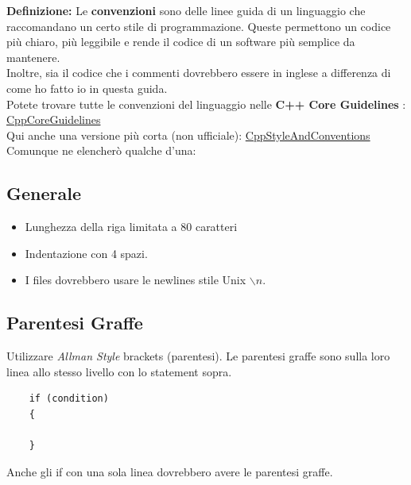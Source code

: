 \textsf{\small \textbf{Definizione: } Le \textbf{convenzioni} sono delle linee guida di un linguaggio che raccomandano un certo stile di programmazione. Queste permettono un codice più chiaro, più leggibile e rende il codice di un software più semplice da mantenere.} \\

\textsf{\small Inoltre, sia il codice che i commenti dovrebbero essere in inglese a differenza di come ho fatto io in questa guida.} \\

\textsf{\small Potete trovare tutte le convenzioni del linguaggio nelle \textbf{C++ Core Guidelines} : \href{https://github.com/isocpp/CppCoreGuidelines}{CppCoreGuidelines}} \\

\textsf{\small Qui anche una versione più corta (non ufficiale): \href{https://github.com/openbmc/docs/blob/master/cpp-style-and-conventions.md}{CppStyleAndConventions}} \\

\textsf{\small Comunque ne elencherò qualche d'una: } \break

\subsection{Generale}

\begin{itemize}
	\item \textsf{\small Lunghezza della riga limitata a 80 caratteri}
	\item \textsf{\small Indentazione con 4 spazi.}
	\item \textsf{\small I files dovrebbero usare le newlines stile Unix $\backslash n$.}
\end{itemize}

\subsection{Parentesi Graffe}

\textsf{\small Utilizzare \emph{Allman Style} brackets (parentesi). Le parentesi graffe sono sulla loro linea allo stesso livello con lo statement sopra.} \\

\begin{lstlisting}
	if (condition)
	{
	
	}
\end{lstlisting}

\textsf{\small Anche gli if con una sola linea dovrebbero avere le parentesi graffe.} \\

